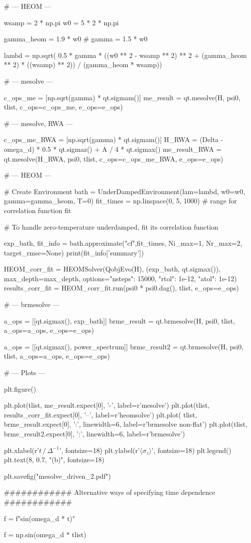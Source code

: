 # --- HEOM ---

wsamp = 2 * np.pi
w0 = 5 * 2 * np.pi

gamma_heom = 1.9 * w0
# gamma = 1.5 * w0


lambd = np.sqrt(
    0.5 * gamma *
    ((w0 ** 2 - wsamp ** 2) ** 2 + (gamma_heom ** 2) * ((wsamp) ** 2)) /
    (gamma_heom * wsamp))


# --- mesolve ---

c_ops_me = [np.sqrt(gamma) * qt.sigmam()]
me_result = qt.mesolve(H, psi0, tlist, c_ops=c_ops_me, e_ops=e_ops)


# --- mesolve, RWA ---

c_ops_me_RWA = [np.sqrt(gamma) * qt.sigmam()]
H_RWA = (Delta - omega_d) * 0.5 * qt.sigmaz() + A / 4 * qt.sigmax()
me_result_RWA = qt.mesolve(H_RWA, psi0, tlist, c_ops=c_ops_me_RWA, e_ops=e_ops)


# --- HEOM ---

# Create Environment
bath = UnderDampedEnvironment(lam=lambd, w0=w0, gamma=gamma_heom, T=0)
fit_times = np.linspace(0, 5, 1000)  # range for correlation function fit

# To handle zero-temperature underdamped, fit its correlation function

exp_bath, fit_info = bath.approximate("cf",fit_times, Ni_max=1, Nr_max=2, target_rmse=None)
print(fit_info['summary'])




HEOM_corr_fit = HEOMSolver(QobjEvo(H), (exp_bath, qt.sigmax()), max_depth=max_depth,
                           options={"nsteps": 15000, "rtol": 1e-12, "atol": 1e-12})
results_corr_fit = HEOM_corr_fit.run(psi0 * psi0.dag(), tlist, e_ops=e_ops)


# --- brmesolve ---

a_ops = [[qt.sigmax(), exp_bath]]
brme_result = qt.brmesolve(H, psi0, tlist, a_ops=a_ops, e_ops=e_ops)

a_ops = [[qt.sigmax(), power_spectrum]]
brme_result2 = qt.brmesolve(H, psi0, tlist, a_ops=a_ops, e_ops=e_ops)


# --- Plots ---

plt.figure()

plt.plot(tlist, me_result.expect[0], '-', label=r'mesolve')
plt.plot(tlist, results_corr_fit.expect[0], '--', label=r'heomsolve')
plt.plot(
    tlist, brme_result.expect[0],
    ':', linewidth=6, label=r'brmesolve non-flat')
plt.plot(tlist, brme_result2.expect[0], ':', linewidth=6, label=r'brmesolve')

plt.xlabel(r'$t\, /\, \Delta^{-1}$', fontsize=18)
plt.ylabel(r'$\langle \sigma_z \rangle$', fontsize=18)
plt.legend()
plt.text(8, 0.7, "(b)", fontsize=18)

plt.savefig("mesolve_driven_2.pdf")

############ Alternative ways of specifying time dependence ############

f = f"sin({omega_d} * t)"

f = np.sin(omega_d * tlist)